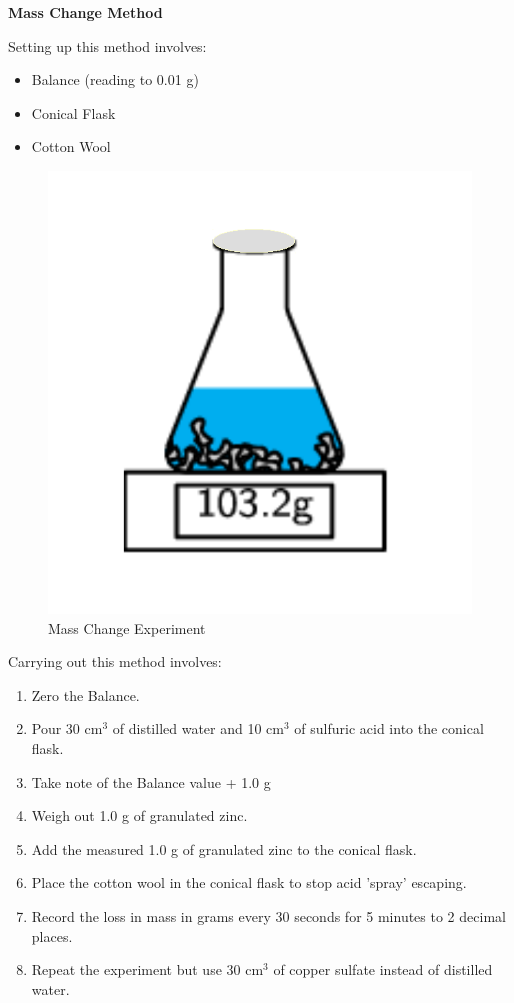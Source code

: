\textbf{Mass Change Method}

Setting up this method involves:
\begin{itemize}
\item Balance (reading to 0.01 g)
\item Conical Flask
\item Cotton Wool
\end{itemize}

\begin{figure}[H]
    \includegraphics[width=\textwidth]{./Planning/Images/MassChange.pdf}
    \caption{Mass Change Experiment} \label{fig:Mass Change}
\end{figure}


Carrying out this method involves:

\begin{enumerate}
\item Zero the Balance.
\item Pour 30 cm$^3$ of distilled water and 10 cm$^3$ of sulfuric acid into the conical flask.
\item Take note of the Balance value + 1.0 g
\item Weigh out 1.0 g of granulated zinc.
\item Add the measured 1.0 g of granulated zinc to the conical flask.
\item Place the cotton wool in the conical flask to stop acid 'spray' escaping.
\item Record the loss in mass in grams every 30 seconds for 5 minutes to 2 decimal places.
\item Repeat the experiment but use 30 cm$^3$ of copper sulfate instead of distilled water.
\end{enumerate} 

